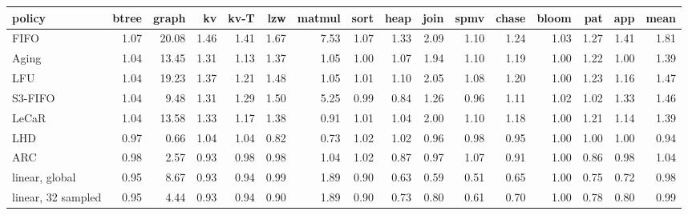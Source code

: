 \begin{tabular}{lrrrrrrrrrrrrrrr}
\toprule
policy & btree & graph & kv & kv-T & lzw & matmul & sort & heap & join & spmv & chase & bloom & pat & app & mean \\
\midrule
FIFO & 1.07 & 20.08 & 1.46 & 1.41 & 1.67 & 7.53 & 1.07 & 1.33 & 2.09 & 1.10 & 1.24 & 1.03 & 1.27 & 1.41 & 1.81 \\
Aging & 1.04 & 13.45 & 1.31 & 1.13 & 1.37 & 1.05 & 1.00 & 1.07 & 1.94 & 1.10 & 1.19 & 1.00 & 1.22 & 1.00 & 1.39 \\
LFU & 1.04 & 19.23 & 1.37 & 1.21 & 1.48 & 1.05 & 1.01 & 1.10 & 2.05 & 1.08 & 1.20 & 1.00 & 1.23 & 1.16 & 1.47 \\
S3-FIFO & 1.04 & 9.48 & 1.31 & 1.29 & 1.50 & 5.25 & 0.99 & 0.84 & 1.26 & 0.96 & 1.11 & 1.02 & 1.02 & 1.33 & 1.46 \\
LeCaR & 1.04 & 13.58 & 1.33 & 1.17 & 1.38 & 0.91 & 1.01 & 1.04 & 2.00 & 1.10 & 1.18 & 1.00 & 1.21 & 1.14 & 1.39 \\
LHD & 0.97 & 0.66 & 1.04 & 1.04 & 0.82 & 0.73 & 1.02 & 1.02 & 0.96 & 0.98 & 0.95 & 1.00 & 1.00 & 1.00 & 0.94 \\
ARC & 0.98 & 2.57 & 0.93 & 0.98 & 0.98 & 1.04 & 1.02 & 0.87 & 0.97 & 1.07 & 0.91 & 1.00 & 0.86 & 0.98 & 1.04 \\
linear, global & 0.95 & 8.67 & 0.93 & 0.94 & 0.99 & 1.89 & 0.90 & 0.63 & 0.59 & 0.51 & 0.65 & 1.00 & 0.75 & 0.72 & 0.98 \\
linear, 32 sampled & 0.95 & 4.44 & 0.93 & 0.94 & 0.90 & 1.89 & 0.90 & 0.73 & 0.80 & 0.61 & 0.70 & 1.00 & 0.78 & 0.80 & 0.99 \\
\bottomrule
\end{tabular}
